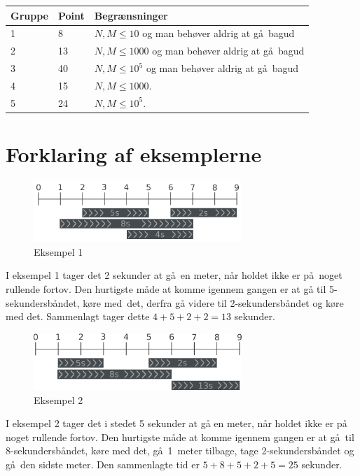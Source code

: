 \noindent
\begin{tabular}{ l  l  l }
Gruppe & Point & Begrænsninger \\ \hline
1     & 8          &  $N,M \le 10$ og man behøver aldrig at gå bagud\\ 
2     & 13         &  $N,M \le 1000$ og man behøver aldrig at gå bagud\\ 
3     & 40         &  $N,M \le 10^5$ og man behøver aldrig at gå bagud\\ 
4     & 15         &  $N,M \le 1000$. \\ 
5     & 24         &  $N,M \le 10^5$. 
\end{tabular}

\section*{Forklaring af eksemplerne}

\begin{figure}[h]
	\centering
\includegraphics[width=0.7\textwidth]{sample1}
\caption{Eksempel 1}
\end{figure}
I eksempel 1 tager det 2 sekunder at gå en meter, når holdet ikke er på noget rullende fortov.
Den hurtigste måde at komme igennem gangen er at gå til 5-sekundersbåndet, køre med det, derfra gå videre til 2-sekundersbåndet og køre med det.
Sammenlagt tager dette $4+5+2+2=13$ sekunder.



\begin{figure}[h]
	\centering
\includegraphics[width=0.7\textwidth]{sample2}
\caption{Eksempel 2}
\end{figure}
I eksempel 2 tager det i stedet 5 sekunder at gå en meter, når holdet ikke er på noget rullende fortov.
Den hurtigste måde at komme igennem gangen er at gå til 8-sekundersbåndet, køre med det, gå 1~meter tilbage, tage 2-sekundersbåndet og gå den sidste meter.
Den sammenlagte tid er $5+8+5+2+5=25$ sekunder.
